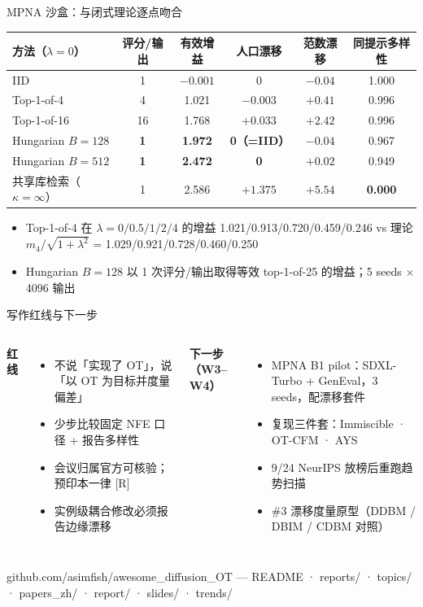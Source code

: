\documentclass[10pt,aspectratio=169]{beamer}
\begin{document}
\begin{frame}{MPNA 沙盒：与闭式理论逐点吻合}
\small
\begin{tabular}{lccccc}\toprule
方法（$\lambda{=}0$） & 评分/输出 & 有效增益 & 人口漂移 & 范数漂移 & 同提示多样性 \\ \midrule
IID & 1 & $-0.001$ & 0 & $-0.04$ & 1.000 \\
Top-1-of-4 & 4 & 1.021 & $-0.003$ & $+0.41$ & 0.996 \\
Top-1-of-16 & 16 & 1.768 & $+0.033$ & $+2.42$ & 0.996 \\
\textcolor{ok}{Hungarian $B{=}128$} & \textbf{1} & \textbf{1.972} & \textbf{0（=IID）} & $-0.04$ & 0.967 \\
\textcolor{ok}{Hungarian $B{=}512$} & \textbf{1} & \textbf{2.472} & \textbf{0} & $+0.02$ & 0.949 \\
\textcolor{bad}{共享库检索（$\kappa{=}\infty$）} & 1 & 2.586 & $+1.375$ & $+5.54$ & \textbf{0.000} \\ \bottomrule
\end{tabular}
\vspace{6pt}
\begin{itemize}
\item Top-1-of-4 在 $\lambda=0/0.5/1/2/4$ 的增益 1.021/0.913/0.720/0.459/0.246 vs 理论 $m_4/\sqrt{1+\lambda^2}$ = 1.029/0.921/0.728/0.460/0.250
\item Hungarian $B{=}128$ 以 1 次评分/输出取得等效 top-1-of-25 的增益；5 seeds $\times$ 4096 输出
\end{itemize}
\end{frame}

\begin{frame}{写作红线与下一步}
\begin{columns}
\textbf{红线}
\begin{itemize}
\item 不说「实现了 OT」，说「以 OT 为目标并度量偏差」
\item 少步比较固定 NFE 口径 + 报告多样性
\item 会议归属官方可核验；预印本一律 [R]
\item 实例级耦合修改必须报告边缘漂移
\end{itemize}
\textbf{下一步（W3--W4）}
\begin{itemize}
\item MPNA B1 pilot：SDXL-Turbo + GenEval，3 seeds，配漂移套件
\item 复现三件套：Immiscible · OT-CFM · AYS
\item 9/24 NeurIPS 放榜后重跑趋势扫描
\item \#3 漂移度量原型（DDBM / DBIM / CDBM 对照）
\end{itemize}
\end{columns}
\vspace{6pt}
\centering github.com/asimfish/awesome\_diffusion\_OT — README · reports/ · topics/ · papers\_zh/ · report/ · slides/ · trends/
\end{frame}
\end{document}
